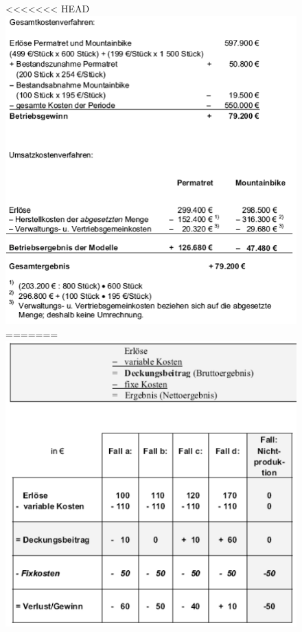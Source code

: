 \documentclass[a4paper,11pt, twoside]{article}
\begin{document}
\begin{figure}[h]
 \begin{center}
<<<<<<< HEAD
   \includegraphics[scale=0.5]{bilder/beispiel_betriebsergebnisrechnung2.png}
=======
   \includegraphics[scale=0.5]{bilder/deckungsbeitragsrechnung.png}
 \end{center}
\end{figure}
\end{document}
